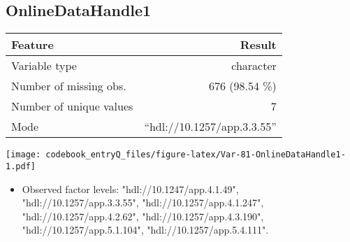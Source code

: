 \documentclass[]{article}
\providecommand{\tightlist}{%
  \setlength{\itemsep}{0pt}\setlength{\parskip}{0pt}}
\newcommand{\fullline}{\noindent\makebox[\linewidth]{\rule{\textwidth}{0.4pt}}}
\newcommand{\bminione}{\begin{minipage}{0.75 \textwidth}}
\newcommand{\bminitwo}{\begin{minipage}{0.25 \textwidth}}
\newcommand{\emini}{\end{minipage}}
\begin{document}
\fullline

\hypertarget{onlinedatahandle1}{\subsection{OnlineDataHandle1}\label{onlinedatahandle1}}

\bminione

\begin{longtable}[]{@{}lr@{}}
\toprule
\begin{minipage}[b]{0.34\columnwidth}\raggedright\strut
Feature\strut
\end{minipage} & \begin{minipage}[b]{0.37\columnwidth}\raggedleft\strut
Result\strut
\end{minipage}\tabularnewline
\midrule
\endhead
\begin{minipage}[t]{0.34\columnwidth}\raggedright\strut
Variable type\strut
\end{minipage} & \begin{minipage}[t]{0.37\columnwidth}\raggedleft\strut
character\strut
\end{minipage}\tabularnewline
\begin{minipage}[t]{0.34\columnwidth}\raggedright\strut
Number of missing obs.\strut
\end{minipage} & \begin{minipage}[t]{0.37\columnwidth}\raggedleft\strut
676 (98.54 \%)\strut
\end{minipage}\tabularnewline
\begin{minipage}[t]{0.34\columnwidth}\raggedright\strut
Number of unique values\strut
\end{minipage} & \begin{minipage}[t]{0.37\columnwidth}\raggedleft\strut
7\strut
\end{minipage}\tabularnewline
\begin{minipage}[t]{0.34\columnwidth}\raggedright\strut
Mode\strut
\end{minipage} & \begin{minipage}[t]{0.37\columnwidth}\raggedleft\strut
``hdl://10.1257/app.3.3.55''\strut
\end{minipage}\tabularnewline
\bottomrule
\end{longtable}

\emini
\bminitwo
\texttt{[image: codebook\_entryQ\_files/figure-latex/Var-81-OnlineDataHandle1-1.pdf]}
\emini

\begin{itemize}
\tightlist
\item
  Observed factor levels: "hdl://10.1247/app.4.1.49",
  "hdl://10.1257/app.3.3.55", "hdl://10.1257/app.4.1.247",
  "hdl://10.1257/app.4.2.62", "hdl://10.1257/app.4.3.190",
  "hdl://10.1257/app.5.1.104", "hdl://10.1257/app.5.4.111".
\end{itemize}
\end{document}
